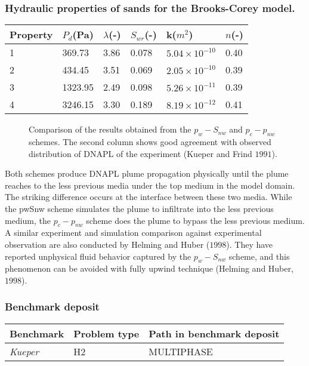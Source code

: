 \subsubsection*{\upshape\textbf{Hydraulic properties of sands for the Brooks-Corey model.}}
\begin{tabular}{|l|l|l|l|l|l|}
\hline
Property & $P_d$(Pa) & $\lambda$(-) &	$S_{wr}$(-) &	k($m^2$) &	$n$(-) \\
\hline
1	& 369.73 & 3.86	& 0.078	& $5.04\times10^{-10}$ & 0.40 \\ 
\hline
2	& 434.45 & 3.51 & 0.069 &	$2.05\times10^{-10}$ & 0.39 \\
\hline
3	& 1323.95 &	2.49 & 0.098 &	$5.26\times10^{-11}$ & 0.39 \\
\hline
4	& 3246.15	& 3.30 & 0.189 & $8.19\times10^{-12}$ &	0.41 \\
\hline
\end{tabular}


\begin{figure}[H]
\begin{center}
\end{center}
\caption{Comparison of the results obtained from the $p_w-S_{nw}$ and $p_c-p_{nw}$ schemes. The second column shows good agreement with observed distribution of DNAPL of the experiment (Kueper and Frind $1991$).}
\label{mcwt:psModel}
\end{figure}
Both schemes produce DNAPL plume propagation physically until the plume reaches to the less previous media under the top medium in the model domain. The striking difference occurs at the interface between these two media. While the pwSnw scheme simulates the plume to infiltrate into the less previous medium, the $p_c-p_{nw}$ scheme does the plume to bypass the less previous medium. A similar experiment and simulation comparison against experimental observation are also conducted by Helming and Huber ($1998$). They have reported unphysical fluid behavior captured by the $p_w-S_{nw}$ scheme, and this phenomenon can be avoided with fully upwind technique (Helming and Huber, $1998$). 
\subsubsection*{\upshape\textbf{Benchmark deposit}}
\begin{tabular}{|l|l|l|}
\hline
Benchmark & Problem type & Path in benchmark deposit \\
\hline
\emph{Kueper}& H2 & MULTIPHASE \\
\hline
\end{tabular}

